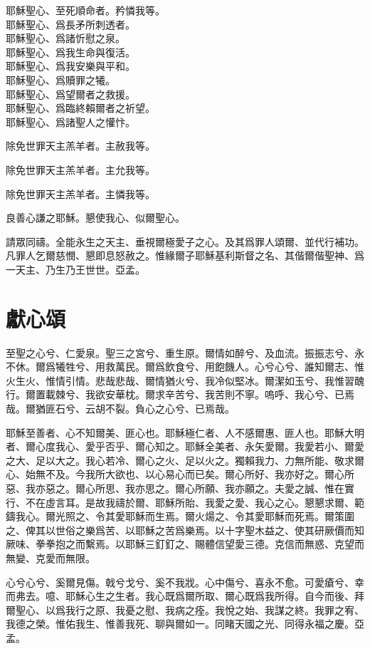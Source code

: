 \versicle 耶穌聖心、至死順命者。\hfill \response 矜憐我等。\\
耶穌聖心、爲長矛所刺透者。\\
耶穌聖心、爲諸忻慰之泉。\\
耶穌聖心、爲我生命與復活。\\
耶穌聖心、爲我安樂與平和。\\
耶穌聖心、爲贖罪之犧。\\
耶穌聖心、爲望爾者之救援。\\
耶穌聖心、爲臨終賴爾者之祈望。\\
耶穌聖心、爲諸聖人之懽忭。

\versicle 除免世罪天主羔羊者。\hfill \response 主赦我等。

\versicle 除免世罪天主羔羊者。\hfill \response 主允我等。

\versicle 除免世罪天主羔羊者。\hfill \response 主憐我等。

\versicle 良善心謙之耶穌。\hfill \response 懇使我心、似爾聖心。

\versicle 請眾同禱。{\cspace}全能永生之天主、垂視爾極愛子之心。及其爲罪人頌爾、並代行補功。凡罪人乞爾慈憫、懇即息怒赦之。惟緣爾子耶穌基利斯督之名、其偕爾偕聖神、爲一天主、乃生乃王世世。{\cspace}亞孟。

\section*{獻心頌}
至聖之心兮、仁愛泉。聖三之宮兮、重生原。爾情如醉兮、及血流。振振志兮、永不休。爾爲犧牲兮、用救萬民。爾爲飲食兮、用飽饑人。心兮心兮、誰知爾志、惟火生火、惟情引情。悲哉悲哉、爾情猶火兮、我冷似堅冰。爾潔如玉兮、我惟習醜行。爾置載棘兮、我欲安華枕。爾求辛苦兮、我苦則不寧。嗚呼、我心兮、已焉哉。爾猶匪石兮、云胡不裂。負心之心兮、已焉哉。

耶穌至善者、心不知爾美、匪心也。耶穌極仁者、人不感爾惠、匪人也。耶穌大明者、爾心度我心、愛乎否乎、爾心知之。耶穌全美者、永矢愛爾。我愛若小、爾愛之大、足以大之。我心若冷、爾心之火、足以火之。獨賴我力、力無所能、敬求爾心、始無不及。今我所大欲也、以心易心而已矣。爾心所好、我亦好之。爾心所惡、我亦惡之。爾心所思、我亦思之。爾心所願、我亦願之。夫愛之誠、惟在實行、不在虛言耳。是故我禱於爾、耶穌所貽、我愛之愛、我心之心。懇懇求爾、範鑄我心。爾光照之、令其愛耶穌而生焉。爾火煬之、令其愛耶穌而死焉。爾策圍之、俾其以世俗之樂爲苦、以耶穌之苦爲樂焉。以十字聖木益之、使其研厥價而知厥味、拳拳抱之而繫焉。以耶穌三釘釘之、賜體信望愛三德。克信而無惑、克望而無變、克愛而無限。

心兮心兮、奚爾見傷。戟兮戈兮、奚不我戕。心中傷兮、喜永不愈。可愛瘡兮、幸而弗去。噫、耶穌心生之生者。我心既爲爾所取、爾心既爲我所得。自今而後、拜爾聖心、以爲我行之原、我憂之慰、我病之痊。我悅之始、我謀之終。我罪之宥、我德之榮。惟佑我生、惟善我死、聊與爾如一。同睹天國之光、同得永福之慶。{\cspace}亞孟。

